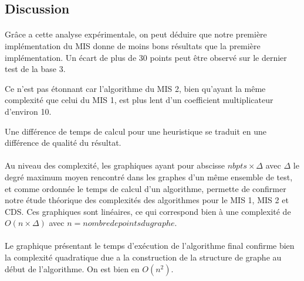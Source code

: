 \newpage
\subsection{Discussion}

\paragraph{}
Grâce a cette analyse expérimentale, on peut déduire que notre première implémentation du MIS donne de moins bons résultats que la première implémentation. Un écart de plus de 30 points peut être observé sur le dernier test de la base 3.

Ce n'est pas étonnant car l'algorithme du MIS 2, bien qu'ayant la même complexité que celui du MIS 1, est plus lent d'un coefficient multiplicateur d'environ 10.

Une différence de temps de calcul pour une heuristique se traduit en une différence de qualité du résultat.

\paragraph{}
Au niveau des complexité, les graphiques ayant pour abscisse $nbpts \times \Delta$ avec $\Delta$ le degré maximum moyen rencontré dans les graphes d'un même ensemble de test, et comme ordonnée le temps de calcul d'un algorithme, permette de confirmer notre étude théorique des complexités des algorithmes pour le MIS 1, MIS 2 et CDS.
Ces graphiques sont linéaires, ce qui correspond bien à une complexité de $O(n \times \Delta)$ avec $n = nombre de points du graphe$.

\paragraph{}
Le graphique présentant le temps d'exécution de l'algorithme final confirme bien la complexité quadratique due a la construction de la structure de graphe au début de l'algorithme. On est bien en $O(n^2)$.